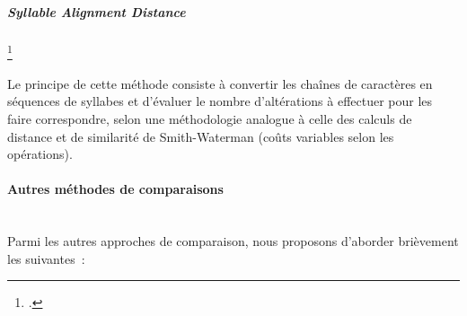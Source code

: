 \documentclass[a4paper,12pt,twoside]{book}
\begin{document}
                
                \subparagraph{Syllable Alignment Distance}\footcite[Voir :][p.~118]{christenDataMatchingConcepts2012}
                
                Le principe de cette méthode consiste à convertir les chaînes de caractères en séquences de syllabes et d'évaluer le nombre d'altérations à effectuer pour les faire correspondre, selon une méthodologie analogue à celle des calculs de distance et de similarité de Smith-Waterman (coûts variables selon les opérations).
                
                \paragraph{Autres méthodes de comparaisons}\mbox{} \\
                
                Parmi les autres approches de comparaison, nous proposons d'aborder brièvement les suivantes~:
                
\end{document}
